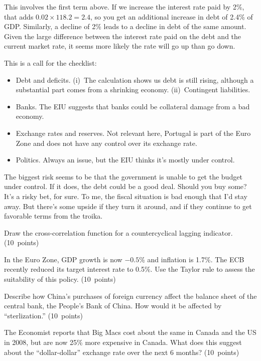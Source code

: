 \documentclass[letterpaper,12pt]{exam}
\begin{document}
\begin{questions}
\begin{solution}
\begin{parts}
\item This involves the first term above.  If we increase the interest rate paid
by 2\%, that adds $ 0.02 \times 118.2 = 2.4$,
so you get an additional increase in debt of 2.4\% of GDP.
Similarly, a decline of 2\% leads to a decline in debt of the same amount.
Given the large difference between the interest rate paid on the debt
and the current market rate, it seems more likely the rate will go up
than go down.

\item This is a call for the checklist:
\begin{itemize}
\item Debt and deficits.
(i)~The calculation shows us debt is still rising, although a substantial part
comes from a shrinking economy.
(ii)~Contingent liabilities.

\item Banks.
The EIU suggests that banks could be collateral damage
from a bad economy.

\item Exchange rates and reserves.  Not relevant here,
Portugal is part of the Euro Zone and does not have any control over
its exchange rate.

\item Politics.  Always an issue, but the EIU thinks
it's mostly under control.
\end{itemize}
The biggest risk seems to be that the government is unable to get
the budget under control.
If it does, the debt could be a good deal.
Should you buy some? It's a risky bet, for sure.
To me, the fiscal situation is bad enough that I'd stay away.
But there's some upside if they turn it around,
and if they continue to get favorable terms from the troika.

\end{parts}
\end{solution}

\begin{parts}
\item Draw the cross-correlation function for a countercyclical lagging indicator.
(10~points)
\item In the Euro Zone, GDP growth is now $-0.5$\%
and inflation is 1.7\%.
The ECB recently reduced its target interest rate to 0.5\%.
Use the Taylor rule to assess the suitability of this policy.
(10~points)
\item Describe how China's purchases of foreign currency affect
the balance sheet of the central bank, the People's Bank of China.
How would it be affected by ``sterlization.''
(10~points)
\item The Economist reports that Big Macs cost about the same in Canada
and the US in 2008, but are now 25\% more expensive in Canada.
What does this suggest about the ``dollar-dollar'' exchange rate over the next 6 months?
(10~points)
\end{parts}


\end{questions}
\end{document}
